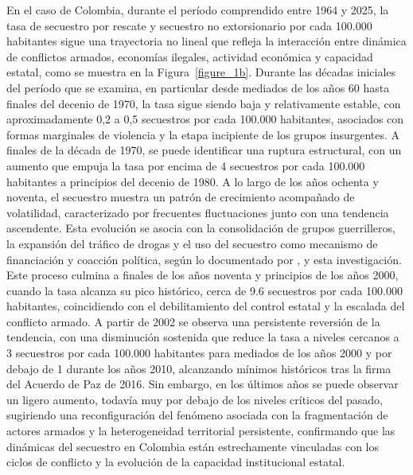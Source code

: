 \documentclass[12pt]{article}
\providecommand{\textcite}{\citet}
\theoremstyle{definition}
\theoremstyle{remark}
\newcommand{\1}{\mathbf{1}}
\begin{document}
En el caso de Colombia, durante el período comprendido entre 1964 y 2025, la tasa de secuestro por rescate y secuestro no extorsionario por cada 100.000 habitantes sigue una trayectoria no lineal que refleja la interacción entre dinámica de conflictos armados, economías ilegales, actividad económica y capacidad estatal, como se muestra en la Figura~\ref{figure_1b}. Durante las décadas iniciales del período que se examina, en particular desde mediados de los años 60 hasta finales del decenio de 1970, la tasa sigue siendo baja y relativamente estable, con aproximadamente 0,2 a 0,5 secuestros por cada 100.000 habitantes, asociados con formas marginales de violencia y la etapa incipiente de los grupos insurgentes. A finales de la década de 1970, se puede identificar una ruptura estructural, con un aumento que empuja la tasa por encima de 4 secuestros por cada 100.000 habitantes a principios del decenio de 1980. A lo largo de los años ochenta y noventa, el secuestro muestra un patrón de crecimiento acompañado de volatilidad, caracterizado por frecuentes fluctuaciones junto con una tendencia ascendente. Esta evolución se asocia con la consolidación de grupos guerrilleros, la expansión del tráfico de drogas y el uso del secuestro como mecanismo de financiación y coacción política, según lo documentado por \textcite{pinto2004}, \textcite{Zarate2007} y esta investigación. Este proceso culmina a finales de los años noventa y principios de los años 2000, cuando la tasa alcanza su pico histórico, cerca de 9.6 secuestros por cada 100.000 habitantes, coincidiendo con el debilitamiento del control estatal y la escalada del conflicto armado. A partir de 2002 se observa una persistente reversión de la tendencia, con una disminución sostenida que reduce la tasa a niveles cercanos a 3 secuestros por cada 100.000 habitantes para mediados de los años 2000 y por debajo de 1 durante los años 2010, alcanzando mínimos históricos tras la firma del Acuerdo de Paz de 2016. Sin embargo, en los últimos años se puede observar un ligero aumento, todavía muy por debajo de los niveles críticos del pasado, sugiriendo una reconfiguración del fenómeno asociada con la fragmentación de actores armados y la heterogeneidad territorial persistente, confirmando que las dinámicas del secuestro en Colombia están estrechamente vinculadas con los ciclos de conflicto y la evolución de la capacidad institucional estatal.
\end{document}
